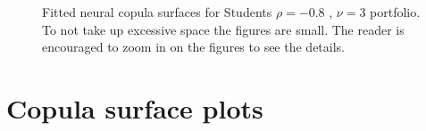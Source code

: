 \documentclass[%
a4paper,							
11pt,								
bibliography=totoc,						
abstracton=true					
]
{scrartcl}
\theoremstyle{plain}
\theoremstyle{definition}
\theoremstyle{remark}
\newcommand{\1}{\mathbbm{1}}
\begin{document}
\begin{figure}[H]
\begin{minipage}{0.49\textwidth}
    \end{minipage}
    \caption{Fitted neural copula surfaces for Students $\rho=-0.8$ , $\nu = 3$ portfolio. To not take up excessive space the figures are small. The reader is encouraged to zoom in on the figures to see the details.}
    \label{fig:GeneratedDataStudents}
\end{figure}



\newpage
\section{Copula surface plots}\label{sec:CopulaSurfacesPlots}
\end{document}
